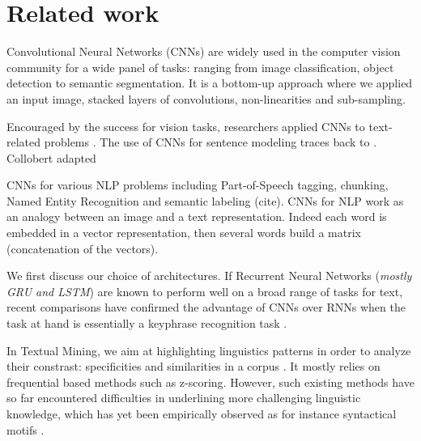 \section{Related work}

Convolutional Neural Networks (CNNs) are widely used in the computer vision community for a wide panel of tasks: ranging from image classification, 
object detection to semantic segmentation. It is a bottom-up approach where we applied an input image, stacked layers of convolutions, non-linearities and sub-sampling.

Encouraged by the success for vision tasks, researchers applied CNNs to text-related problems \cite{kalchbrenner2014convolutional, kim2014convolutional}. The use of CNNs for sentence modeling traces back to \cite{Coll:08}. Collobert adapted 

CNNs for various NLP problems including Part-of-Speech tagging, chunking, Named Entity Recognition and semantic labeling (cite). 
CNNs for NLP work as an analogy between an image and a text representation. Indeed each word is embedded in a vector representation, then several words build a matrix (concatenation of the vectors). 


We first discuss our choice of architectures. 
If Recurrent Neural Networks (\textit{mostly GRU and LSTM}) are known to perform well on a broad range of tasks for text, recent comparisons have confirmed the advantage of CNNs 
over RNNs when the task at hand is essentially a keyphrase recognition task \cite{yin2017comparative}. 

In Textual Mining, we aim at highlighting linguistics patterns in order to analyze their constrast: specificities and similarities in a corpus \cite{Fel:07, Leb:98}. It mostly relies on frequential based methods such as z-scoring. However, such existing methods have so far encountered difficulties in underlining more challenging linguistic knowledge, which has yet been empirically observed as for instance syntactical motifs \cite{mellet:09}.

